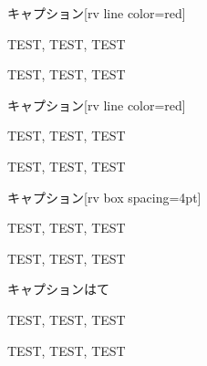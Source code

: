 \begin{rv@ascolorbox2@caption}{キャプション}[rv line color=red]

TEST, TEST, TEST

\end{rv@ascolorbox2@caption}

\begin{rv@ascolorbox2@nocaption}

TEST, TEST, TEST

\end{rv@ascolorbox2@nocaption}

\begin{rv@ascolorbox3@caption}{キャプション}[rv line color=red]

TEST, TEST, TEST

\end{rv@ascolorbox3@caption}

\begin{rv@ascolorbox3@nocaption}[rv dummy caption=ほげほげほげほげ, rv line color=red]

TEST, TEST, TEST

\end{rv@ascolorbox3@nocaption}

\begin{rv@ascolorbox4@caption}{キャプション}[rv box spacing=4pt]

TEST, TEST, TEST

\end{rv@ascolorbox4@caption}

\begin{rv@ascolorbox4@nocaption}

TEST, TEST, TEST

\end{rv@ascolorbox4@nocaption}

\begin{rv@ascolorbox5@caption}{キャプションはて}

TEST, TEST, TEST

\end{rv@ascolorbox5@caption}

\begin{rv@ascolorbox5@nocaption}

TEST, TEST, TEST

\end{rv@ascolorbox5@nocaption}

% 
% 
% 
% 
% 
% 
% 
% 

